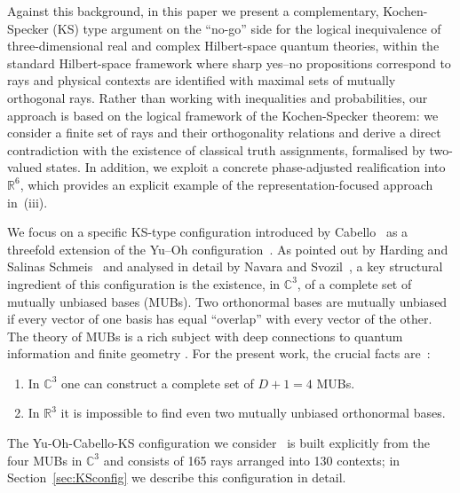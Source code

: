 \documentclass[%
  reprint,
  superscriptaddress,
  amsmath,amssymb,
  pra,
  floatfix,
  longbibliography
]{revtex4-2}
\begin{document}
Against this background, in this paper we present a complementary, Kochen-Specker (KS) type argument on the ``no-go'' side for the logical
inequivalence of three-dimensional real and complex Hilbert-space quantum
theories, within the standard Hilbert-space framework where sharp yes--no
propositions correspond to rays and physical contexts are identified with
maximal sets of mutually orthogonal rays. Rather than working with
inequalities and probabilities, our approach is based on the logical
framework of the Kochen-Specker theorem: we consider a finite set of
rays and their orthogonality relations and derive a direct contradiction
with the existence of classical truth assignments, formalised by
two-valued states. In addition, we exploit a concrete phase-adjusted realification into
$\mathbb{R}^6$, which provides an explicit example of the representation-focused
approach in~(iii).

We focus on a specific KS-type configuration introduced by Cabello~\cite{Cabello2025}
as a threefold extension of the Yu--Oh configuration~\cite{Yu-2012}. As pointed
out by Harding and Salinas Schmeis~\cite{harding2025remarksIJTP} and analysed
in detail by Navara and Svozil~\cite{svozil-2025-MYOCHS}, a key structural
ingredient of this configuration is the existence, in $\mathbb{C}^3$, of a complete
set of mutually unbiased bases (MUBs). Two orthonormal bases are mutually
unbiased if every vector of one basis has equal ``overlap'' with every vector
of the other. The theory of MUBs is a rich subject with deep connections to
quantum information and finite geometry
\cite{Schwinger.60,WooFie,Brierley2009,springerlink:10.1007/978-3-540-24633-6_10,durt,mcnulty2024mutually}.
For the present work, the crucial facts are~\cite{durt,mcnulty2024mutually}:
\begin{enumerate}
  \item In $\mathbb{C}^3$ one can construct a complete set of $D+1=4$ MUBs.
  \item In $\mathbb{R}^3$ it is impossible to find even two mutually unbiased
        orthonormal bases.
\end{enumerate}

The Yu-Oh-Cabello-KS configuration we consider~\cite{Cabello2025} is built
explicitly from the four MUBs in $\mathbb{C}^3$ and consists of 165 rays arranged
into 130 contexts; in Section~\ref{sec:KSconfig} we describe this
configuration in detail.
\end{document}
